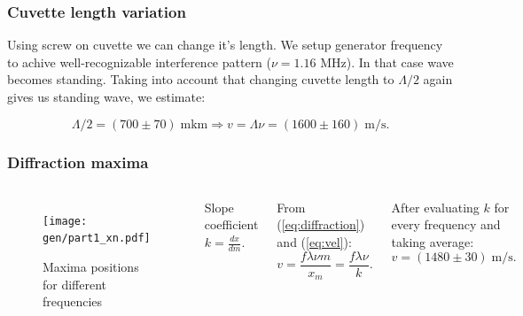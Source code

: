 \documentclass{beamer}
\begin{document}
	\begin{frame}
		\frametitle{Cuvette length variation}

		Using screw on cuvette we can change it's length. We setup generator frequency to achive well-recognizable interference pattern ($\nu = 1.16$ MHz). In that case wave becomes standing. Taking into account that changing cuvette length to $\Lambda / 2$ again gives us standing wave, we estimate: 
		
		$$ \Lambda / 2 = (700 \pm 70)\; \text{mkm} \Rightarrow v = \Lambda \nu = (1600 \pm 160) \;\text{m/s}.$$
		
	\end{frame}


	\begin{frame}
		\frametitle{Diffraction maxima}
		\begin{columns}
			\begin{figure}
				\centering
				\texttt{[image: gen/part1\_xn.pdf]}
				\caption{Maxima positions for different frequencies}
				\label{fig:part1_xn}
			\end{figure}
			Slope coefficient $k = \frac{dx}{dm}$.
			
			From (\ref{eq:diffraction}) and (\ref{eq:vel}):
			$$ v = \frac{f \lambda \nu m}{x_m} = \frac{f \lambda \nu}{k}.$$
			
			After evaluating $k$ for every frequency and taking average:
			$$ v = (1480 \pm 30)\; \text{m/s}.$$
			
		\end{columns}
				
	\end{frame}
\end{document}
